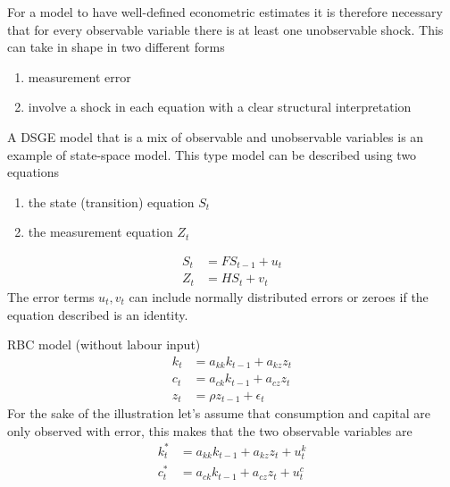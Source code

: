 \documentclass{beamer}
\begin{document}
\begin{frame}
 For a model to have well-defined econometric estimates it is therefore necessary that for every observable variable there is at least one unobservable shock. 
This can take in shape in two different forms
\begin{enumerate}
  \item measurement error
  \item involve a shock in each equation with a clear structural interpretation
\end{enumerate}
\end{frame}

\begin{frame}
  A DSGE model that is a mix of observable and unobservable variables is an example of state-space model. 
This type model can be described using two equations
\begin{enumerate}
  \item the state (transition) equation $S_t$
  \item the measurement equation $Z_t$
\end{enumerate}
\begin{align*}
    S_t &= FS_{t-1} + u_t\\
    Z_t &= HS_t+v_t
\end{align*}
The error terms $u_t,v_t$ can include normally distributed errors or zeroes if the equation described is an identity.
\end{frame}

\begin{frame}
 RBC model (without labour input)  
\begin{align}
  k_t &= a_{kk}k_{t-1} + a_{kz}z_t\\
  c_t &= a_{ck}k_{t-1} + a_{cz}z_t\\
  z_t &= \rho z_{t-1} + \epsilon_t
\end{align}
For the sake of the illustration let's assume that consumption and capital are only observed with error, this makes that the two observable variables are
\begin{align}
  k_t^* &= a_{kk}k_{t-1} + a_{kz}z_t + u_t^k\\
  c_t^* &= a_{ck}k_{t-1} + a_{cz}z_t + u_t^c\\  
\end{align}
\end{frame}
\end{document}
